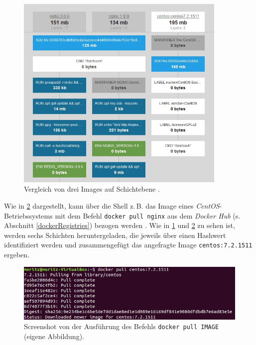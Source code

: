 \documentclass[../main.tex]{subfiles}
\begin{document}
			\begin{figure}[!htbp]
          \centering
          \includegraphics[width=0.9\textwidth]{./images/intro_imagelayers.jpg}
          \caption{Vergleich von drei Images auf Schichtebene \cite{dockerImagelayers}.}
          \label{fig:intro_imagelayers}
      \end{figure}


      Wie in \fig \ref{fig:intro_dockerPull} dargestellt, kann über die \gls{Shell} z.\,B. das Image eines \emph{CentOS}-Betriebssystems mit dem Befehl \texttt{docker pull nginx} aus dem \emph{Docker Hub} (s. Abschnitt \ref{dockerRegistries}) bezogen werden \cite{dockerHubNginx}\cite{dockerPull}. Wie in \fig \ref{fig:intro_imagelayers} und \fig \ref{fig:intro_dockerPull} zu sehen ist, werden sechs Schichten heruntergeladen, die jeweils über einen Hashwert identifiziert werden und zusammengefügt das angefragte Image \texttt{centos:7.2.1511} ergeben.

			\begin{figure}[!htbp]
          \centering
          \includegraphics[width=1.0\textwidth]{./images/intro_dockerPull.jpg}
          \caption{Screenshot von der Ausführung des Befehls \texttt{docker pull IMAGE} (eigene Abbildung).}
          \label{fig:intro_dockerPull}
      \end{figure}
\end{document}
